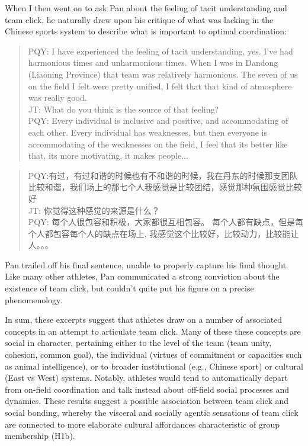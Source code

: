 \begin{CJK}{UTF8}{gbsn}
When I then went on to ask Pan about the feeling of tacit understanding and team click, he naturally drew upon his critique of what was lacking in the Chinese sports system to describe what is important to optimal coordination:

  \begin{quote}
    PQY: I have experienced the feeling of tacit understanding, yes. I've had harmonious times and unharmonious times. When I was in Dandong (Liaoning Province) that team was relatively harmonious.  The seven of us on the field I felt were pretty unified, I felt that that kind of atmosphere was really good. \\

    JT: What do you think is the source of that feeling? \\

    PQY: Every individual is inclusive and positive, and accommodating of each other. Every individual has weaknesses, but then everyone is accommodating of the weaknesses on the field, I feel that its better like that, its more motivating, it makes people...
  \end{quote}

  \begin{quote}
    PQY:有过，有过和谐的时候也有不和谐的时候，我在丹东的时候那支团队比较和谐，我们场上的那七个人我感觉是比较团结，感觉那种氛围感觉比较好 \\
    JT: 你觉得这种感觉的来源是什么？\\
    PQY: 每个人很包容和积极，大家都很互相包容。 每个人都有缺点，但是每个人都包容每个人的缺点在场上, 我感觉这个比较好，比较动力，比较能让人。。。
  \end{quote}

Pan trailed off his final sentence, unable to properly capture his final thought.  Like many other athletes, Pan communicated a strong conviction about the existence of team click, but couldn't quite put his figure on a precise phenomenology.


In sum, these excerpts suggest that athletes draw on a number of associated concepts in an attempt to articulate team click. Many of these these concepts are social in character, pertaining either to the level of the team (team unity, cohesion, common goal), the individual (virtues of commitment or capacities such as animal intelligence), or to broader institutional (e.g., Chinese sport) or cultural (East vs West) systems.  Notably, athletes would tend to automatically depart from on-field coordination and talk instead about off-field social processes and dynamics.  These results suggest a possible association between team click and social bonding, whereby the visceral and socially agentic sensations of team click are connected to more elaborate cultural affordances characteristic of group membership (H1b).


\end{CJK}
